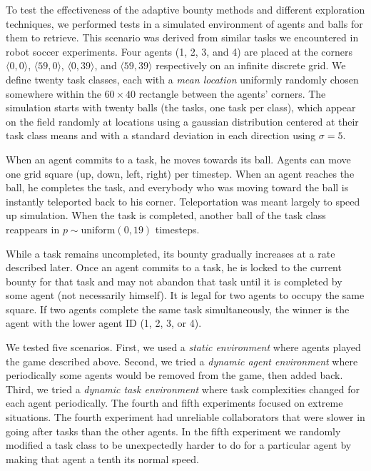 \documentclass[letterpaper]{aamas2015}
\begin{document}
To test the effectiveness of the adaptive bounty methods and different exploration techniques, we performed tests in a simulated environment of agents and balls for them to retrieve.  This scenario was derived from similar tasks we encountered in robot soccer experiments.  Four agents (1, 2, 3, and 4) are placed at the corners \(\langle 0,0\rangle\), \(\langle 59, 0\rangle\), \(\langle 0, 39\rangle\), and \(\langle 59, 39\rangle\) respectively on an infinite discrete grid.  We define twenty task classes, each with a {\it mean location} uniformly randomly chosen somewhere within the \(60 \times 40\) rectangle between the agents' corners.  The simulation starts with twenty balls (the tasks, one task per class), which appear on the field randomly at locations using a gaussian distribution centered at their task class means and with a standard deviation in each direction using \(\sigma=5\).

When an agent commits to a task, he moves towards its ball.  Agents can move one grid square (up, down, left, right) per timestep.  When an agent reaches the ball, he completes the task, and everybody who was moving toward the ball is instantly teleported back to his corner.  Teleportation was meant largely to speed up simulation.  When the task is completed, another ball of the task class reappears in \(p \sim \text{uniform}(0, 19)\) timesteps. 

While a task remains uncompleted, its bounty gradually increases at a rate described later.  Once an agent commits to a task, he is locked to the current bounty for that task and may not abandon that task until it is completed by some agent (not necessarily himself). It is legal for two agents to occupy the same square. If two agents complete the same task simultaneously, the winner is the agent with the lower agent ID (1, 2, 3, or 4).

We tested five scenarios.  First, we used a {\it static environment} where agents played the game described above.  Second, we tried a {\it dynamic agent environment} where periodically some agents would be removed from the game, then added back.  Third, we tried a {\it dynamic task environment} where task complexities changed for each agent periodically.  The fourth and fifth experiments focused on extreme situations.  The fourth experiment had unreliable collaborators that were slower in going after tasks than the other agents.  In the fifth experiment we randomly modified a task class to be unexpectedly harder to do for a particular agent by making that agent a tenth its normal speed.
\end{document}
